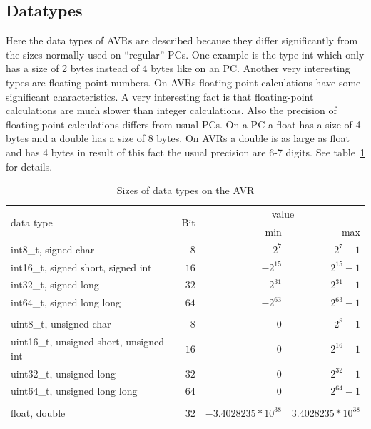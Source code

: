 \subsection{Datatypes} \label {sec:datatypes}
Here the data types of AVRs are described because they differ significantly from the sizes normally used on ``regular'' PCs.
One example is the type int which only has a size of 2 bytes instead of 4 bytes like on an PC.
Another very interesting types are floating-point numbers. 
On AVRs floating-point calculations have some significant characteristics.
A very interesting fact is that floating-point calculations are much slower than integer calculations.
Also the precision of floating-point calculations differs from usual PCs.
On a PC a float has a size of 4 bytes and a double has a size of 8 bytes.
On AVRs a double is as large as float and has 4 bytes in result of this fact the usual precision are 6-7 digits.
See table~\ref{tab:datatypes} for details.

\begin{table}
{\large
\begin{center}
\begin{tabular}{|l|r|r|r|}
\hline
\multirow{2}{*}{data type} & \multirow{2}{*}{Bit} & \multicolumn{2}{|c|}{value}  \\
\cline{3-4}
& & min & max \\
\hline
int8\_t, signed char				& $8$	& $-2^{7}$		& $2^{7}-1$	\\
int16\_t, signed short, signed int		& $16$	& $-2^{15}$		& $2^{15}-1$	\\
int32\_t, signed long				& $32$ 	& $-2^{31}$		& $2^{31}-1$	\\
int64\_t, signed long long			& $64$ 	& $-2^{63}$		& $2^{63}-1$	\\
& & & \\
uint8\_t, unsigned char			& $8$	& $0$			& $2^{8}-1$	\\
uint16\_t, unsigned short, unsigned int	& $16$ 	& $0$ 			& $2^{16}-1$	\\
uint32\_t, unsigned long			& $32$ 	& $0$			& $2^{32}-1$	\\
uint64\_t, unsigned long long		& $64$ 	& $0$			& $2^{64}-1$	\\
& & & \\
float, double					& $32$ 	& $-3.4028235*10^{38}$	& $3.4028235*10^{38}$	\\
\hline
\end{tabular}
\end{center}
}
\caption{Sizes of data types on the AVR}
\label{tab:datatypes}
\end{table}


